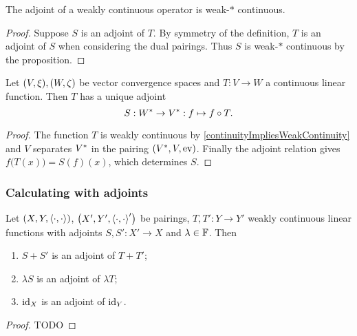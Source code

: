 \begin{corollary} \label{weak*continuityAdjoint}
The adjoint of a weakly continuous operator is weak-$*$ continuous.
\end{corollary}
\begin{proof}
Suppose $S$ is an adjoint of $T$. By symmetry of the definition, $T$ is an adjoint of $S$ when considering the dual pairings. Thus $S$ is weak-$*$ continuous by the proposition.
\end{proof}
\begin{corollary}
Let $\sSet{V,\xi}, \sSet{W,\zeta}$ be vector convergence spaces and $T: V\to W$ a continuous linear function. Then $T$ has a unique adjoint
\[ S: {W}^*\to {V}^*: f\mapsto f\circ T. \]
\end{corollary}
\begin{proof}
The function $T$ is weakly continuous by \ref{continuityImpliesWeakContinuity} and $V$ separates ${V}^*$ in the pairing $\sSet{\dual{V}, V, \evalMap}$. Finally the adjoint relation gives $f\big(T(x)\big) = S(f)(x)$, which determines $S$.
\end{proof}

\subsubsection{Calculating with adjoints}
\begin{proposition}
Let $\sSet{X,Y,\pair{\cdot,\cdot}}$, $\sSet{X',Y',\pair{\cdot,\cdot}'}$ be pairings, $T, T': Y\to Y'$ weakly continuous linear functions with adjoints $S, S': X'\to X$ and $\lambda\in \mathbb{F}$. Then
\begin{enumerate}
\item $S+S'$ is an adjoint of $T+T'$;
\item $\lambda S$ is an adjoint of $\lambda T$;
\item $\operatorname{id}_X$ is an adjoint of $\operatorname{id}_Y$.
\end{enumerate}
\end{proposition}
\begin{proof}
TODO
\end{proof}

